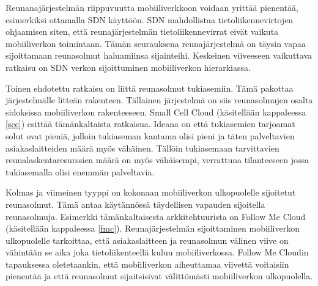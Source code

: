 Reunanajärjestelmän riippuvuutta mobiiliverkkoon voidaan yrittää pienentää, esimerkiksi ottamalla SDN käyttöön. SDN mahdollistaa tietoliikennevirtojen ohjaamisen siten, että reunajärjestelmän tietoliikennevirrat eivät vaikuta mobiiliverkon toimintaan. Tämän seurauksena reunajärjestelmä on täysin vapaa sijoittamaan reunasolmut haluamiinsa sijainteihi. Keskeinen viiveeseen vaikuttava ratkaisu on SDN verkon sijoittuminen mobiiliverkon hierarkiassa.

Toinen ehdotettu ratkaisu on liittä reunasolmut tukiasemiin. Tämä pakottaa järjestelmälle litteän rakenteen.
Tällainen järjestelmä on siis reunasolmujen osalta sidoksissa mobiiliverkon rakenteeseen. Small Cell Cloud (käsitellään kappaleessa \ref{scc}) esittää tämänkaltaista ratkaisua.
Ideana on että tukiasemien tarjoamat solut ovat pieniä, jolloin tukiaseman kantama olisi pieni ja täten palveltavien asiakaslaitteiden määrä myös vähäinen. Tällöin tukiasemaan tarvittavien reunalaskentaresurssien määrä on myös vähäisempi, verrattuna tilanteeseen jossa tukiasemalla olisi enemmän palveltavia. 

Kolmas ja viimeinen tyyppi on kokonaan mobiiliverkon ulkopuolelle sijoitetut reunasolmut. Tämä antaa käytännössä täydellisen vapauden sijoitella reunasolmuja. Esimerkki tämänkaltaisesta arkkitehtuurista on Follow Me Cloud (käsitellään kappaleessa \ref{fmc}). Reunajärjestelmän sijoittaminen mobiiliverkon ulkopuolelle tarkoittaa, että asiakaslaitteen ja reunasolmun välinen viive on vähintään se aika joka tietoliikenteellä kuluu mobiiliverkossa. Follow Me Cloudin tapauksessa oletetaankin, että mobiiliverkon aiheuttamaa viivettä voitaisiin pienentää ja että reunasolmut sijaitsisivat välittömästi mobiiliverkon ulkopuolella. 
















